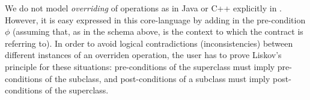 We do not model \emph{overriding}  of operations as in Java or C++ explicitly in \FOCL. 
However, it is easy expressed in this core-language by adding  in the pre-condition $\phi$ (assuming
  that, as in the schema above,  is the context to which the contract is referring to).
In order to avoid logical contradictions (inconsistencies) between different instances of an 
overriden operation, the user has to prove Liskov's principle for these situations:
pre-conditions of the superclass must imply pre-conditions of the subclass, and post-conditions
of a subclass must imply post-conditions of the superclass. 



